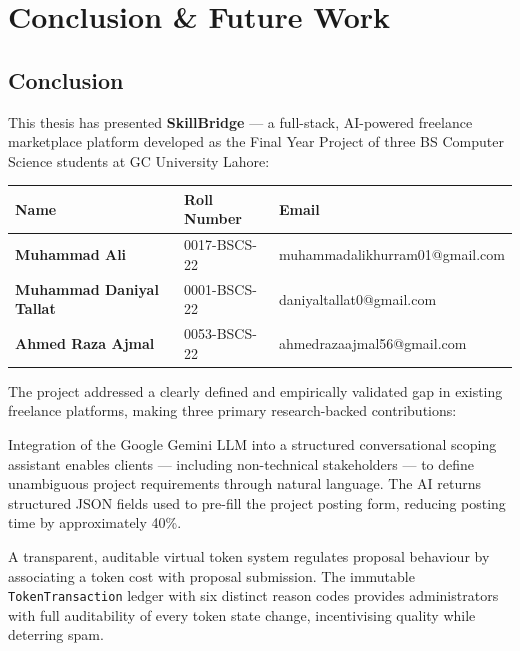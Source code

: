 
\chapter{Conclusion \& Future Work}
\label{Chapter5}

\section{Conclusion}

This thesis has presented \textbf{SkillBridge} — a full-stack, AI-powered freelance
marketplace platform developed as the Final Year Project of three BS Computer Science
students at GC University Lahore:

\begin{center}
\renewcommand{\arraystretch}{1.4}
\begin{tabular}{>{\bfseries}l l l}
\toprule
Name & Roll Number & Email \\
\midrule
Muhammad Ali           & 0017-BSCS-22 & muhammadalikhurram01@gmail.com \\
Muhammad Daniyal Tallat& 0001-BSCS-22 & daniyaltallat0@gmail.com \\
Ahmed Raza Ajmal       & 0053-BSCS-22 & ahmedrazaajmal56@gmail.com \\
\bottomrule
\end{tabular}
\end{center}

\vspace{1em}
The project addressed a clearly defined and empirically validated gap in existing
freelance platforms, making three primary research-backed contributions:

\begin{infobox}
Integration of the Google Gemini LLM into a structured conversational scoping assistant
enables clients — including non-technical stakeholders — to define unambiguous project
requirements through natural language. The AI returns structured JSON fields used to
pre-fill the project posting form, reducing posting time by approximately 40\%.
\end{infobox}

\vspace{0.5em}
\begin{infobox}
A transparent, auditable virtual token system regulates proposal behaviour by associating
a token cost with proposal submission. The immutable \texttt{TokenTransaction} ledger
with six distinct reason codes provides administrators with full auditability of every
token state change, incentivising quality while deterring spam.
\end{infobox}

